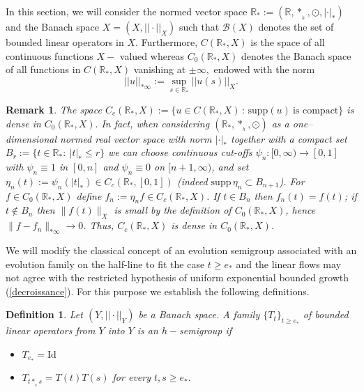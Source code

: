 \documentclass[10pt]{amsart}
\newtheorem{definition}{Definition}
\numberwithin{equation}{section}
\newtheorem{Remark}{Remark}
\begin{document}
In this section, we will consider the normed vector space $ \mathbb{R}_* := (\mathbb{R}, *_{_h}, \odot, |\cdot|_*)$ and
the Banach space $X = (X, ||\cdot||_X)$ such that $\mathcal{B}(X)$ denotes the set of bounded linear operators in $X.$ Furthermore, $C(\mathbb{R}_*, X)$ is the space of all continuous functions $X-$ valued whereas $C_0(\mathbb{R}_*, X)$ denotes the Banach space of all functions in 
$C(\mathbb{R}_*, X)$ vanishing at $\pm \infty,$ endowed with the norm
$$
||u||_{*\infty} := \sup_{s\in \mathbb{R}_*} ||u(s)||_X.
$$

\begin{Remark}
  The space $ C_c(\mathbb{R}_*, X) := \{u \in C(\mathbb{R}_*, X) \, : \, \mathrm{supp}(u) \ \mbox{is compact} \}$ is dense in $C_0(\mathbb{R}_*, X).$ In fact, when considering $(\mathbb R_*,*_{_h},\odot)$ as a \emph{one–dimensional normed real vector space} with norm $|\cdot |_{*}$ together with a compact set
$B_r:=\{t\in\mathbb R_*:\ |t|_*\le r\}$ we can choose continuous cut-offs $\psi_n:[0,\infty)\to[0,1]$ with $\psi_n\equiv1$ in $[0,n]$ and $\psi_n\equiv0$ on $[n+1,\infty)$, and set $\eta_n(t):=\psi_n(|t|_*)\in C_c(\mathbb R_*,[0,1])$ (indeed $\mathrm{supp}\,\eta_n\subset B_{n+1}$). 
For $f\in C_0(\mathbb R_*,X)$ define $f_n:=\eta_n f\in C_c(\mathbb R_*,X)$. If $t\in B_n$ then $f_n(t)=f(t)$; if $t\notin B_n$ then $\|f(t)\|_X$ is small by the definition of $C_0(\mathbb R_*,X)$, hence $\|f-f_n\|_{*\infty}\to0$.
Thus, $C_c(\mathbb R_*,X)$ is dense in $C_0(\mathbb R_*,X)$.
\end{Remark}



We will modify the classical concept of an evolution semigroup associated with an evolution family on the half-line to fit the case $t \geq e_*$ and the linear flows may not agree with the restricted hypothesis of uniform exponential bounded growth (\ref{decroissance}). For this purpose we establish the following definitions.
\medskip

\begin{definition}
\label{demigroupe}
Let $(Y,||\cdot||_{Y})$ be a Banach space.  A family $\{T_t\}_{t \ge e_*}$ of bounded linear operators from $Y$ into $Y$ is an $h-$semigroup if 
 \begin{itemize}
     \item[(i)] $T_{e_*} =  \mathrm{Id}$
\item[(ii)] $T_{t*_{_h}s} = T(t)T(s)$ for every $t, s \ge e_*.$
\end{itemize}
 \end{definition}
\end{document}
